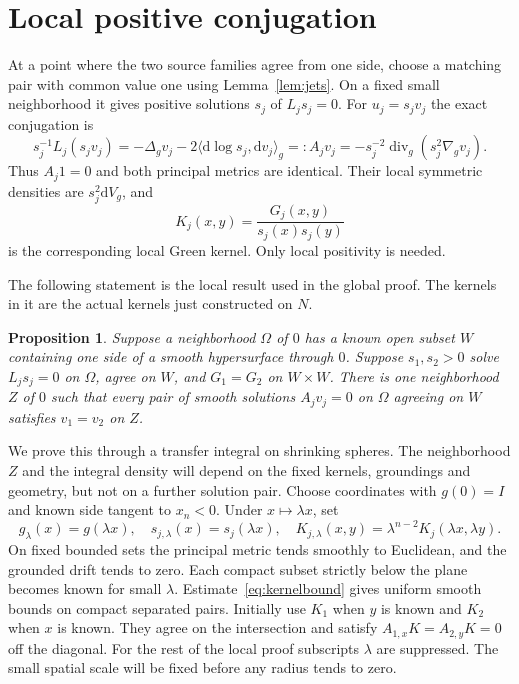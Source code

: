 \documentclass[11pt]{article}
\newtheorem{proposition}[theorem]{Proposition}
\theoremstyle{definition}\newtheorem{definition}[theorem]{Definition}
\theoremstyle{remark}\newtheorem{remark}[theorem]{Remark}
\newcommand{\dd}{\mathrm d}
\newcommand{\vol}{\dd V}
\newcommand{\Div}{\operatorname{div}}
\newcommand{\ip}[2]{\langle #1,#2\rangle}
\begin{document}
\section{Local positive conjugation}\label{sec:local}

At a point where the two source families agree from one side, choose a
matching pair with common value one using Lemma~\ref{lem:jets}. On a fixed
small neighborhood it gives positive solutions $s_j$ of $L_js_j=0$.
For $u_j=s_jv_j$ the exact conjugation is
\begin{equation}\label{eq:ground}
 s_j^{-1}L_j(s_jv_j)
 =-\Delta_gv_j-2\ip{\dd\log s_j}{\dd v_j}_g
 =:A_jv_j=-s_j^{-2}\Div_g(s_j^2\nabla_gv_j).
\end{equation}
Thus $A_j1=0$ and both principal metrics are identical. Their local
symmetric densities are $s_j^2\vol_g$, and
\[
 K_j(x,y)=\frac{G_j(x,y)}{s_j(x)s_j(y)}
\]
is the corresponding local Green kernel. Only local positivity is needed.

The following statement is the local result used in the global proof.
The kernels in it are the actual kernels just constructed on $N$.
\begin{proposition}\label{prop:local}
Suppose a neighborhood $\Omega$ of $0$ has a known open subset $W$ containing
one side of a smooth hypersurface through $0$. Suppose $s_1,s_2>0$ solve
$L_js_j=0$ on $\Omega$, agree on $W$, and $G_1=G_2$ on $W\times W$.
There is one neighborhood $Z$ of $0$ such that every pair of smooth
solutions $A_jv_j=0$ on $\Omega$ agreeing on $W$ satisfies $v_1=v_2$ on $Z$.
\end{proposition}

We prove this through a transfer integral on shrinking spheres. The
neighborhood $Z$ and the integral density will depend on the fixed kernels,
groundings and geometry, but not on a further solution pair.
Choose coordinates with $g(0)=I$ and known side tangent to $x_n<0$.
Under $x\mapsto\lambda x$, set
\[
 g_\lambda(x)=g(\lambda x),\quad s_{j,\lambda}(x)=s_j(\lambda x),\quad
 K_{j,\lambda}(x,y)=\lambda^{n-2}K_j(\lambda x,\lambda y).
\]
On fixed bounded sets the principal metric tends smoothly to Euclidean,
and the grounded drift tends to zero. Each compact subset strictly below
the plane becomes known for small $\lambda$. Estimate~\eqref{eq:kernelbound}
gives uniform smooth bounds on compact separated pairs. Initially use
$K_1$ when $y$ is known and $K_2$ when $x$ is known. They agree on the
intersection and satisfy $A_{1,x}K=A_{2,y}K=0$ off the diagonal.
For the rest of the local proof subscripts $\lambda$ are suppressed.
The small spatial scale will be fixed before any radius tends to zero.
\end{document}

